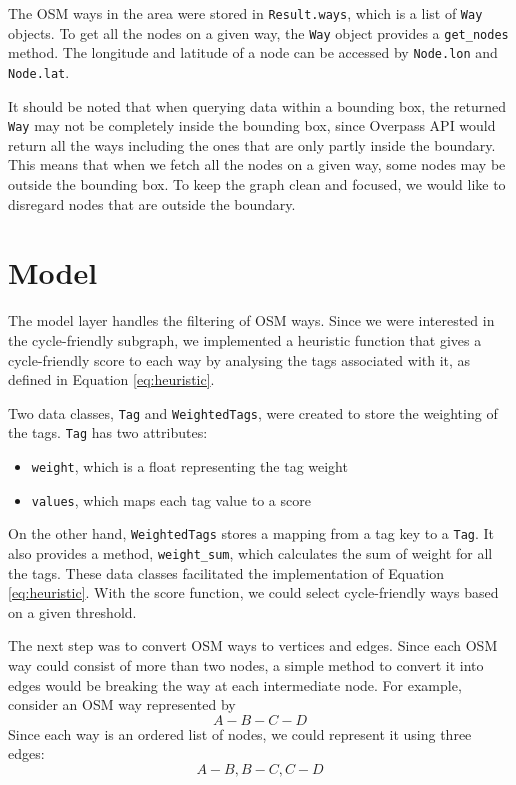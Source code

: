 \documentclass[12pt,a4paper]{report}
\begin{document}
The OSM ways in the area were stored in \texttt{Result.ways}, which is a list of \texttt{Way} objects. To get all the nodes on a given way, the \texttt{Way} object provides a \texttt{get\_nodes} method. The longitude and latitude of a node can be accessed by \texttt{Node.lon} and \texttt{Node.lat}.

It should be noted that when querying data within a bounding box, the returned \texttt{Way} may not be completely inside the bounding box, since Overpass API would return all the ways including the ones that are only partly inside the boundary. This means that when we fetch all the nodes on a given way, some nodes may be outside the bounding box. To keep the graph clean and focused, we would like to disregard nodes that are outside the boundary.

\section{Model}\label{sec:model impl}
The model layer handles the filtering of OSM ways. Since we were interested in the cycle-friendly subgraph, we implemented a heuristic function that gives a cycle-friendly score to each way by analysing the tags associated with it, as defined in Equation \ref{eq:heuristic}.

Two data classes, \texttt{Tag} and \texttt{WeightedTags}, were created to store the weighting of the tags. \texttt{Tag} has two attributes:
\begin{itemize}
    \item \texttt{weight}, which is a float representing the tag weight
    \item \texttt{values}, which maps each tag value to a score
\end{itemize}

On the other hand, \texttt{WeightedTags} stores a mapping from a tag key to a \texttt{Tag}. It also provides a method, \texttt{weight\_sum}, which calculates the sum of weight for all the tags. These data classes facilitated the implementation of Equation \ref{eq:heuristic}. With the score function, we could select cycle-friendly ways based on a given threshold.

The next step was to convert OSM ways to vertices and edges. Since each OSM way could consist of more than two nodes, a simple method to convert it into edges would be breaking the way at each intermediate node. For example, consider an OSM way represented by
\[A - B - C - D\]
Since each way is an ordered list of nodes, we could represent it using three edges:
\[A - B, B - C, C - D\]
\end{document}
